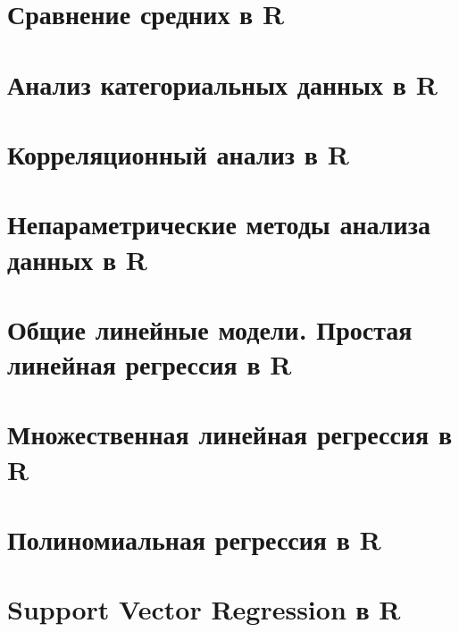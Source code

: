 \documentclass[
  letterpaper,
]{scrbook}
\theoremstyle{definition}
\theoremstyle{remark}
\begin{document}
\chapter{Сравнение средних в R}\label{randan-ttest}


\chapter{Анализ категориальных данных в R}\label{randan-chisq}


\chapter{Корреляционный анализ в R}\label{randan-corr}


\chapter{Непараметрические методы анализа данных в
R}\label{randan-nonparam}


\chapter{Общие линейные модели. Простая линейная регрессия в
R}\label{randan-simplelinear}


\chapter{Множественная линейная регрессия в
R}\label{randan-multiplelinear}


\chapter{Полиномиальная регрессия в R}\label{randan-polynomial}


\chapter{Support Vector Regression в R}\label{randan-svr}
\end{document}
